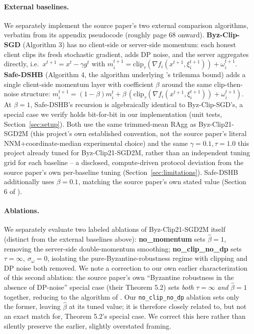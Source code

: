 \documentclass{article}
\begin{document}
\paragraph{External baselines.} We separately implement the source paper's two
external comparison algorithms, verbatim from its appendix pseudocode (roughly
page 68 onward). \textbf{Byz-Clip-SGD} (Algorithm 3) has no client-side or
server-side momentum: each honest client clips its fresh stochastic gradient,
adds DP noise, and the server aggregates directly, i.e.\ $x^{t+1}=x^t-\gamma
g^t$ with $m_i^{t+1}=\mathrm{clip}_\tau(\nabla f_i(x^{t+1},\xi_i^{t+1}))+
\omega_i^{t+1}$. \textbf{Safe-DSHB} (Algorithm 4, the algorithm underlying
\citeauthor{allouah2023trilemma}'s trilemma bound) adds a single client-side
momentum layer with coefficient $\beta$ around the same clip-then-noise
structure: $m_i^{t+1}=(1-\beta)m_i^t+\beta\,(\mathrm{clip}_\tau(\nabla
f_i(x^{t+1},\xi_i^{t+1}))+\omega_i^{t+1})$. At $\beta{=}1$, Safe-DSHB's
recursion is algebraically identical to Byz-Clip-SGD's, a special case we
verify holds bit-for-bit in our implementation (unit tests,
Section~\ref{sec:setup}). Both use the same trimmed-mean RAgg as
Byz-Clip21-SGD2M (this project's own established convention, not the source
paper's literal NNM+coordinate-median experimental choice) and the same
$\gamma{=}0.1,\tau{=}1.0$ this project already tuned for Byz-Clip21-SGD2M,
rather than an independent tuning grid for each baseline -- a disclosed,
compute-driven protocol deviation from the source paper's own per-baseline
tuning (Section~\ref{sec:limitations}). Safe-DSHB additionally uses
$\beta{=}0.1$, matching the source paper's own stated value (Section 6 of
\citealt{islamov2026byzclip}).

\paragraph{Ablations.} We separately evaluate two labeled ablations of
Byz-Clip21-SGD2M itself (distinct from the external baselines above):
\textbf{no\_momentum} sets
$\hat\beta=1$, removing the server-side double-momentum smoothing;
\textbf{no\_clip\_no\_dp} sets $\tau=\infty,\ \sigma_\omega=0$, isolating the
pure-Byzantine-robustness regime with clipping and DP noise both removed. We
note a correction to our own earlier characterization of this second ablation:
the source paper's own ``Byzantine robustness in the absence of DP-noise''
special case (their Theorem 5.2) sets \emph{both} $\tau=\infty$ \emph{and}
$\hat\beta=1$ together, reducing to the algorithm of
\citet{karimireddy2020byzantine}. Our \texttt{no\_clip\_no\_dp} ablation sets
only the former, leaving $\hat\beta$ at its tuned value; it is therefore closely
related to, but not an exact match for, Theorem 5.2's special case. We correct
this here rather than silently preserve the earlier, slightly overstated framing.
\end{document}
